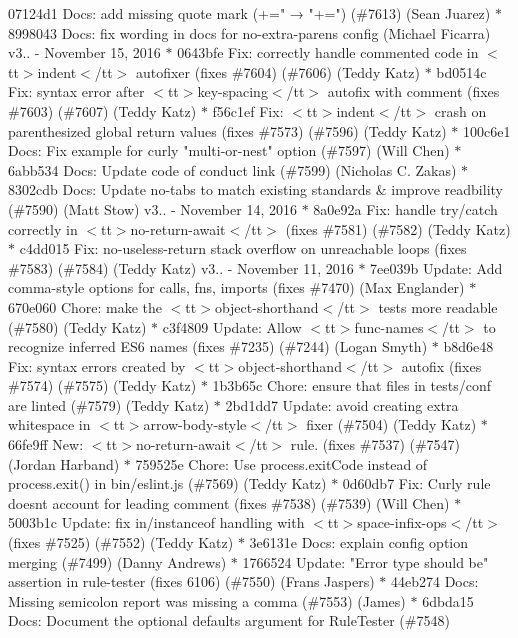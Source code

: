 \begin{DoxyItemize}
\item 07124d1 Docs\+: add missing quote mark (+="{} → "{}+="{}) (\#7613) (\+Sean Juarez) \texorpdfstring{$\ast$}{*} 8998043 Docs\+: fix wording in docs for no-\/extra-\/parens config (\+Michael Ficarra)  v3.. -\/ November 15, 2016  \texorpdfstring{$\ast$}{*} 0643bfe Fix\+: correctly handle commented code in $<$tt$>$indent$<$/tt$>$ autofixer (fixes \#7604) (\#7606) (\+Teddy Katz) \texorpdfstring{$\ast$}{*} bd0514c Fix\+: syntax error after $<$tt$>$key-\/spacing$<$/tt$>$ autofix with comment (fixes \#7603) (\#7607) (\+Teddy Katz) \texorpdfstring{$\ast$}{*} f56c1ef Fix\+: $<$tt$>$indent$<$/tt$>$ crash on parenthesized global return values (fixes \#7573) (\#7596) (\+Teddy Katz) \texorpdfstring{$\ast$}{*} 100c6e1 Docs\+: Fix example for curly "{}multi-\/or-\/nest"{} option (\#7597) (\+Will Chen) \texorpdfstring{$\ast$}{*} 6abb534 Docs\+: Update code of conduct link (\#7599) (\+Nicholas C. Zakas) \texorpdfstring{$\ast$}{*} 8302cdb Docs\+: Update no-\/tabs to match existing standards \& improve readbility (\#7590) (\+Matt Stow)  v3.. -\/ November 14, 2016  \texorpdfstring{$\ast$}{*} 8a0e92a Fix\+: handle try/catch correctly in $<$tt$>$no-\/return-\/await$<$/tt$>$ (fixes \#7581) (\#7582) (\+Teddy Katz) \texorpdfstring{$\ast$}{*} c4dd015 Fix\+: no-\/useless-\/return stack overflow on unreachable loops (fixes \#7583) (\#7584) (\+Teddy Katz)  v3.. -\/ November 11, 2016  \texorpdfstring{$\ast$}{*} 7ee039b Update\+: Add comma-\/style options for calls, fns, imports (fixes \#7470) (\+Max Englander) \texorpdfstring{$\ast$}{*} 670e060 Chore\+: make the $<$tt$>$object-\/shorthand$<$/tt$>$ tests more readable (\#7580) (\+Teddy Katz) \texorpdfstring{$\ast$}{*} c3f4809 Update\+: Allow $<$tt$>$func-\/names$<$/tt$>$ to recognize inferred ES6 names (fixes \#7235) (\#7244) (\+Logan Smyth) \texorpdfstring{$\ast$}{*} b8d6e48 Fix\+: syntax errors created by $<$tt$>$object-\/shorthand$<$/tt$>$ autofix (fixes \#7574) (\#7575) (\+Teddy Katz) \texorpdfstring{$\ast$}{*} 1b3b65c Chore\+: ensure that files in tests/conf are linted (\#7579) (\+Teddy Katz) \texorpdfstring{$\ast$}{*} 2bd1dd7 Update\+: avoid creating extra whitespace in $<$tt$>$arrow-\/body-\/style$<$/tt$>$ fixer (\#7504) (\+Teddy Katz) \texorpdfstring{$\ast$}{*} 66fe9ff New\+: $<$tt$>$no-\/return-\/await$<$/tt$>$ rule. (fixes \#7537) (\#7547) (\+Jordan Harband) \texorpdfstring{$\ast$}{*} 759525e Chore\+: Use process.\+exit\+Code instead of process.\+exit() in bin/eslint.\+js (\#7569) (\+Teddy Katz) \texorpdfstring{$\ast$}{*} 0d60db7 Fix\+: Curly rule doesn\textquotesingle{}t account for leading comment (fixes \#7538) (\#7539) (\+Will Chen) \texorpdfstring{$\ast$}{*} 5003b1c Update\+: fix in/instanceof handling with $<$tt$>$space-\/infix-\/ops$<$/tt$>$ (fixes \#7525) (\#7552) (\+Teddy Katz) \texorpdfstring{$\ast$}{*} 3e6131e Docs\+: explain config option merging (\#7499) (\+Danny Andrews) \texorpdfstring{$\ast$}{*} 1766524 Update\+: "{}Error type should be"{} assertion in rule-\/tester (fixes 6106) (\#7550) (\+Frans Jaspers) \texorpdfstring{$\ast$}{*} 44eb274 Docs\+: Missing semicolon report was missing a comma (\#7553) (\+James) \texorpdfstring{$\ast$}{*} 6dbda15 Docs\+: Document the optional defaults argument for Rule\+Tester (\#7548) 
\end{DoxyItemize}
